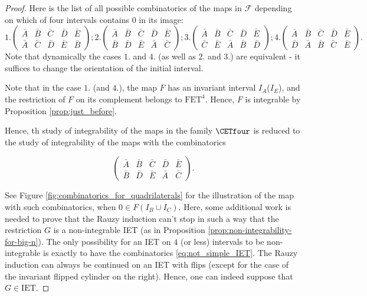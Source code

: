 \documentclass[12pt]{article}
\theoremstyle{definition}
\begin{document}
\begin{proof}
Here is the list of all  possible combinatorics of the maps in $\mathcal{F}$ depending on which of four intervals contains $0$ in its image:
\begin{equation*}
1. \begin{pmatrix} \bar{A} &\bar{B} & \bar{C} & \bar{D} & \bar{E} \\
\bar{A} &\bar{C} & \bar{D} & \bar{E} & \bar{B}
\end{pmatrix}; 2. \begin{pmatrix} \bar{A} &\bar{B} & \bar{C} & \bar{D} & \bar{E} \\
\bar{B} &\bar{D} & \bar{E} & \bar{A} & \bar{C}
\end{pmatrix}; 
3. \begin{pmatrix} \bar{A} &\bar{B} & \bar{C} & \bar{D} & \bar{E} \\
\bar{C} &\bar{E} & \bar{A} & \bar{B} & \bar{D}
\end{pmatrix}; 
4. \begin{pmatrix} \bar{A} &\bar{B} & \bar{C} & \bar{D} & \bar{E} \\
\bar{D} &\bar{A} & \bar{B} & \bar{C} & \bar{E}
\end{pmatrix}.
\end{equation*}
Note that dynamically the cases $1.$ and $4.$ (as well as $2.$ and $3.$) are equivalent - it suffices to change the orientation of the initial interval.

Note that in the case $1.$ (and $4.$), the map $F$ has an invariant interval $I_A$($I_E$), and the restriction of $F$ on its complement belongs to $\mathrm{FET}^4$. Hence, $F$ is integrable by Proposition \ref{prop:just_before}.

Hence, th study of integrability of the maps in the family $\CETfour$ is reduced to the study of integrability of the maps with the combinatorics 

\begin{equation}\label{eq:combinatorics_CETfour}
\begin{pmatrix} \bar{A} &\bar{B} & \bar{C} & \bar{D} & \bar{E} \\
\bar{B} &\bar{D} & \bar{E} & \bar{A} & \bar{C}
\end{pmatrix}.
\end{equation}

See Figure \ref{fig:combinatorics_for_quadrilaterals} for the illustration of the map with such combinatorics, when $0 \in F(I_B  \cup I_C) $. Here, some additional work is needed to prove that the Rauzy induction can't stop in such a way that the 
restriction $G$ is a non-integrable IET (as in Proposition \ref{prop:non-integrability-for-big-n}). The only possibility for an IET on $4$ (or less) intervals to be non-integrable is exactly to have the combinatorics \eqref{eq:not_simple_IET}. The Rauzy induction can always be continued on an IET with flips (except for the case of the invariant flipped cylinder on the right). Hence, one can indeed suppose that $G \in \mathrm{IET}$. 


\end{proof}
\end{document}

